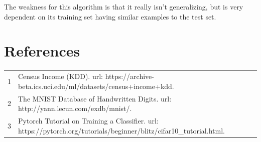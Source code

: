 \documentclass[letterpaper]{article} %
\begin{document}
The weakness for this algorithm is that it really isn't generalizing, but is very dependent on its training set having similar examples to the test set.



\section{References}
\begin{tabular}{l p{2.75in}}
\\
1 & Census Income (KDD). url: https://archive-beta.ics.uci.edu/ml/datasets/census+income+kdd.
\\
2 & The MNIST Database of Handwritten Digits. url: http://yann.lecun.com/exdb/mnist/.
\\
3 & Pytorch Tutorial on Training a Classifier. url: https://pytorch.org/tutorials/beginner/blitz/cifar10\_tutorial.html.
\end{tabular}
\end{document}
